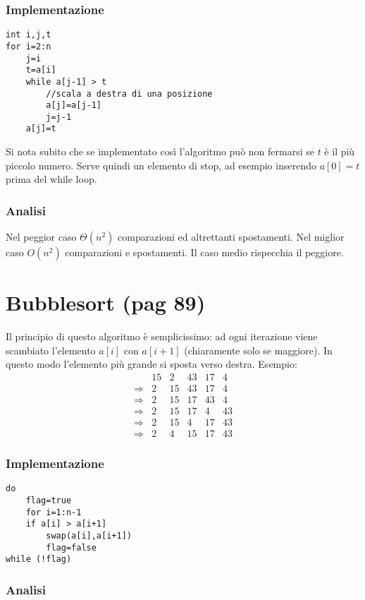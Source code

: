 \documentclass[a4paper]{book}
\begin{document}
\subsubsection*{Implementazione}
\begin{lstlisting}
int i,j,t
for i=2:n
	j=i
	t=a[i]
	while a[j-1] > t
		//scala a destra di una posizione
		a[j]=a[j-1]
		j=j-1
	a[j]=t
\end{lstlisting}
Si nota subito che se implementato così l'algoritmo può non fermarsi se $t$ è il più piccolo numero. Serve quindi un elemento di stop, ad esempio inserendo $a[0]=t$ prima del while loop.

\subsubsection*{Analisi}

Nel peggior caso $\Theta (n^2)$ comparazioni ed altrettanti spostamenti. Nel miglior caso $O(n^2)$ comparazioni e spostamenti. Il caso medio rispecchia il peggiore.

\section{Bubblesort (pag 89)}
Il principio di questo algoritmo è semplicissimo: ad ogni iterazione viene scambiato l'elemento $a[i]$ con $a[i+1]$ (chiaramente solo se maggiore). In questo modo l'elemento più grande si sposta verso destra. Esempio:
\[\begin{array}{*{20}{c}}
{}&{15}&2&{43}&{17}&4\\
{\Rightarrow}&2&{15}&{43}&{17}&4\\
{\Rightarrow}&2&{15}&{17}&{43}&4\\
{\Rightarrow}&2&{15}&{17}&4&{43}\\
{\Rightarrow}&2&{15}&4&{17}&{43}\\
{\Rightarrow}&2&4&{15}&{17}&{43}
\end{array}\]
\subsubsection*{Implementazione}
\begin{lstlisting}
do
	flag=true
	for i=1:n-1
	if a[i] > a[i+1] 
		swap(a[i],a[i+1])
		flag=false
while (!flag)
\end{lstlisting}
\subsubsection*{Analisi}
\end{document}
